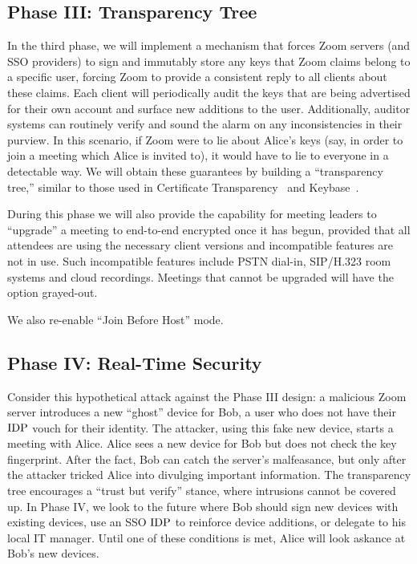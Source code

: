\subsection{Phase III: Transparency Tree}
In the third phase, we will implement a mechanism that forces Zoom servers (and SSO providers) to sign and immutably store any keys that Zoom claims belong to a specific user, forcing Zoom to provide a consistent reply to all clients about these claims. Each client will periodically audit the keys that are being advertised for their own account and surface new additions to the user. Additionally, auditor systems can routinely verify and sound the alarm on any inconsistencies in their purview. In this scenario, if Zoom were to lie about Alice's keys (say, in order to join a meeting which Alice is invited to), it would have to lie to everyone in a detectable way. We will obtain these guarantees by building a ``transparency tree,'' similar to those used in Certificate Transparency~\cite{langley2013certificate} and Keybase~\cite{keybase}.

During this phase we will also provide the capability for meeting leaders to ``upgrade'' a meeting to end-to-end encrypted once it has begun, provided that all attendees are using the necessary client versions and incompatible features are not in use. Such incompatible features include PSTN dial-in, SIP/H.323 room systems and cloud recordings. Meetings that cannot be upgraded will have the option grayed-out. 

We also re-enable ``Join Before Host'' mode.

\subsection{Phase IV: Real-Time Security}
Consider this hypothetical attack against the Phase III design: a malicious Zoom server introduces a new ``ghost'' device for Bob, a user who does not have their $\mathrm{IDP}$ vouch for their identity. The attacker, using this fake new device, starts a meeting with Alice. Alice sees a new device for Bob but does not check the key fingerprint. After the fact, Bob can catch the server's malfeasance, but only after the attacker tricked Alice into divulging important information. The transparency tree encourages a ``trust but verify'' stance, where intrusions cannot be covered up. In Phase IV, we look to the future where Bob should sign new devices with existing devices, use an SSO $\mathrm{IDP}$ to reinforce device additions, or delegate to his local IT manager. Until one of these conditions is met, Alice will look askance at Bob's new devices.
